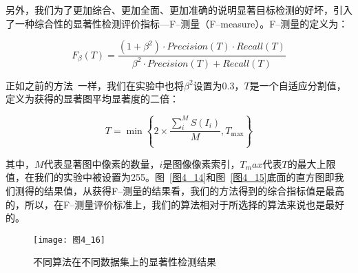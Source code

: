 另外，我们为了更加综合、更加全面、更加准确的说明显著目标检测的好坏，引入了一种综合性的显著性检测评价指标---F--测量（F--measure）。F--测量的定义为：
\begin{linenomath}
\begin{equation}
F_{\beta}(T)=\frac{(1+\beta^{2})\cdot Precision(T)\cdot Recall(T)}{\beta^{2}\cdot Precision(T)+Recall(T)}
\label{式4_29}
\end{equation}
\end{linenomath}
正如之前的方法~\cite{AchantaCVPR2009Frequency,YanQiongCVPR2013Hierarchical,ShenXiaohuiCVPR2012unified}一样，我们在实验中也将$\beta^{2}$设置为0.3，$T$是一个自适应分割值，定义为获得的显著图平均显著度的二倍：
\begin{linenomath}
\begin{equation}
T=\min\left\{2\times \frac{\sum^{M}_{i}S(I_{i})}{M},T_{\max}\right\}
\label{式4_30}
\end{equation}
\end{linenomath}
其中，$M$代表显著图中像素的数量，$i$是图像像素索引，$T_max$代表$T$的最大上限值，在我们的实验中被设置为255。图~\ref{图4_14}和图~\ref{图4_15}底面的直方图即我们测得的结果值，从获得F--测量的结果看，我们的方法得到的综合指标值是最高的，所以，在F--测量评价标准上，我们的算法相对于所选择的算法来说也是最好的。
\begin{figure}[h]
  \centering
  \texttt{[image: 图4\_16]}
  \caption{不同算法在不同数据集上的显著性检测结果}   
  \label{图4_16} 
\end{figure}


